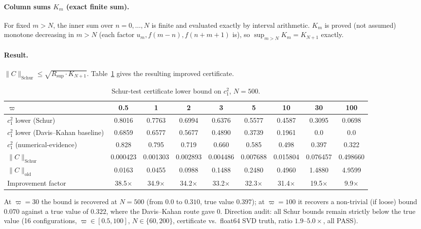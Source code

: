 \documentclass[11pt]{article}
\begin{document}
\paragraph{Column sums $K_m$ (exact finite sum).} For fixed $m>N$, the inner
sum over $n=0,\dots,N$ is finite and evaluated exactly by interval
arithmetic. $K_m$ is proved (not assumed) monotone decreasing in $m>N$ (each
factor $u_m,f(m-n),f(n+m+1)$ is), so $\sup_{m>N}K_m=K_{N+1}$ exactly.

\paragraph{Result.} $\|C\|_{\text{Schur}}\le\sqrt{R_{\sup}\cdot K_{N+1}}$.
Table~\ref{tab:schur} gives the resulting improved certificate.

\begin{table}[h]
\centering
\caption{Schur-test certificate lower bound on $c_1^2$, $N=500$.}
\label{tab:schur}
\begin{tabular}{lcccccccc}
\toprule
$\varpi$ & 0.5 & 1 & 2 & 3 & 5 & 10 & 30 & 100\\
\midrule
$c_1^2$ lower (Schur) & 0.8016 & 0.7763 & 0.6994 & 0.6376 & 0.5577 & 0.4587 & 0.3095 & 0.0698\\
$c_1^2$ lower (Davis--Kahan baseline) & 0.6859 & 0.6577 & 0.5677 & 0.4890 & 0.3739 & 0.1961 & 0.0 & 0.0\\
$c_1^2$ (numerical-evidence) & 0.828 & 0.795 & 0.719 & 0.660 & 0.585 & 0.498 & 0.397 & 0.322\\
$\|C\|_{\text{Schur}}$ & 0.000423 & 0.001303 & 0.002893 & 0.004486 & 0.007688 & 0.015804 & 0.076457 & 0.498660\\
$\|C\|_{\text{old}}$ & 0.0163 & 0.0455 & 0.0988 & 0.1488 & 0.2480 & 0.4960 & 1.4880 & 4.9599\\
Improvement factor & 38.5$\times$ & 34.9$\times$ & 34.2$\times$ & 33.2$\times$ & 32.3$\times$ & 31.4$\times$ & 19.5$\times$ & 9.9$\times$\\
\bottomrule
\end{tabular}
\end{table}

At $\varpi=30$ the bound is recovered at $N=500$ (from $0.0$ to $0.310$,
true value $0.397$); at $\varpi=100$ it recovers a non-trivial (if loose)
bound $0.070$ against a true value of $0.322$, where the Davis--Kahan route
gave $0$. Direction audit: all Schur bounds remain strictly below the true
value (16 configurations, $\varpi\in[0.5,100]$, $N\in\{60,200\}$, certificate
vs.\ float64 SVD truth, ratio $1.9$--$5.0\times$, all PASS).
\end{document}

